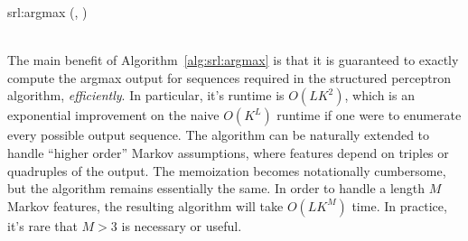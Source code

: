 \newalgorithm%
  {srl:argmax}%
  {(\VAR{$\vx$}, \VAR{$\vw$})}
  {
        \\
        \\
      \ENDFOR
    \ENDFOR
    \ENDFOR
    \RETURN \VAR{$\vy$}
  }

The main benefit of Algorithm~\ref{alg:srl:argmax} is that it is guaranteed to exactly compute the argmax output for sequences required in the structured perceptron algorithm, \emph{efficiently}.
In particular, it's runtime is $O(LK^2)$, which is an exponential improvement on the naive $O(K^L)$ runtime if one were to enumerate every possible output sequence.
The algorithm can be naturally extended to handle ``higher order'' Markov assumptions, where features depend on triples or quadruples of the output.
The memoization becomes notationally cumbersome, but the algorithm remains essentially the same.
In order to handle a length $M$ Markov features, the resulting algorithm will take $O(LK^M)$ time.
In practice, it's rare that $M>3$ is necessary or useful.

